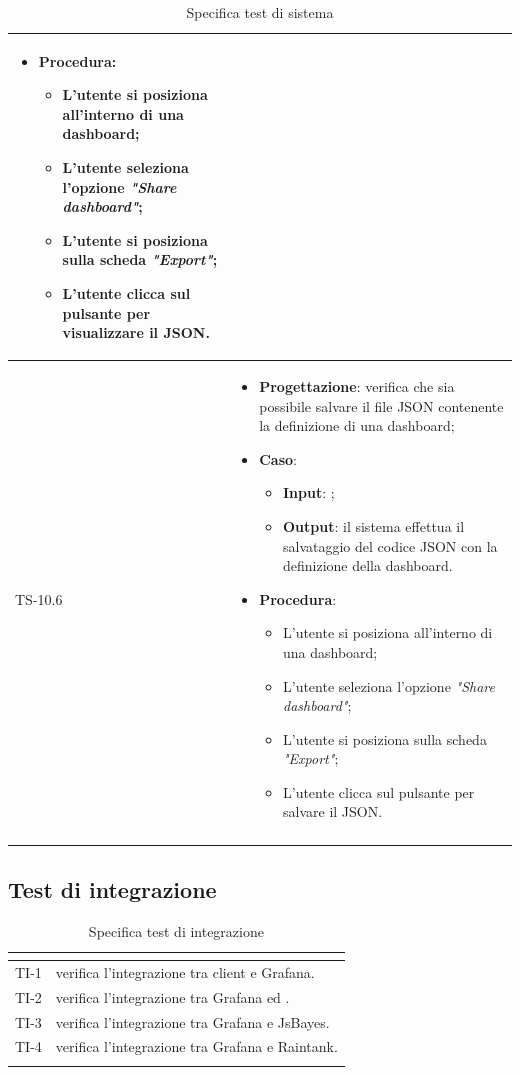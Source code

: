 \begin{longtable}{|C{2.5cm}|C{13cm}|}
\begin{itemize}
	\item \textbf{Procedura}:
	\begin{itemize}
		\item L'utente si posiziona all'interno di una dashboard;
		\item L'utente seleziona l'opzione \emph{"Share dashboard"};
		\item L'utente si posiziona sulla scheda \emph{"Export"};
		\item L'utente clicca sul pulsante per visualizzare il JSON.
	\end{itemize} 
\end{itemize}
	  \\
	\hline
	{TS-10.6} & 
\begin{itemize}
	\item \textbf{Progettazione}: verifica che sia possibile salvare il file
	JSON contenente la definizione di una dashboard;
	\item \textbf{Caso}: 
	\begin{itemize}
		\item \textbf{Input}: ;
		\item \textbf{Output}: il sistema effettua il salvataggio del codice JSON con la definizione della dashboard.
	\end{itemize}
	\item \textbf{Procedura}:
	\begin{itemize}
		\item L'utente si posiziona all'interno di una dashboard;
		\item L'utente seleziona l'opzione \emph{"Share dashboard"};
		\item L'utente si posiziona sulla scheda \emph{"Export"};
		\item L'utente clicca sul pulsante per salvare il JSON.
	\end{itemize} 
\end{itemize}
	 \\
	\hline
	\caption{Specifica test di sistema}
	\label{tabella:specifica TS}
\end{longtable}
\renewcommand{\arraystretch}{1}
\newpage

\subsection{Test di integrazione}
\normalsize
\renewcommand{\arraystretch}{1}
\begin{longtable}{|C{2.5cm}|C{13cm}|}
	\hline
	\textbf{\color{title_text}{Test}} & \textbf{\color{title_text}{Specifica}}  \\
	\hline
	\endhead
	{TI-1} & verifica l'integrazione tra client e Grafana. \\
	\hline
	{TI-2} & verifica l'integrazione tra Grafana ed . \\
	\hline
	{TI-3} & verifica l'integrazione tra Grafana e JsBayes.\\
	\hline
	{TI-4} & verifica l'integrazione tra Grafana e Raintank. \\
	\hline
	\caption{Specifica test di integrazione}
	\label{tabella:specifica ti}
\end{longtable}
\renewcommand{\arraystretch}{1}
\newpage

